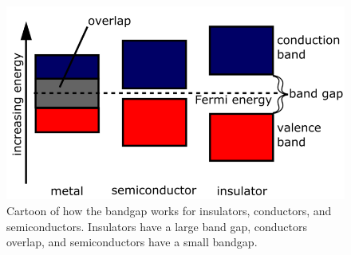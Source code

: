 \begin{figure}
    \centering
    \includegraphics[scale=0.5]{Setup_Figs/semiconductor.png}
    \caption{Cartoon of how the bandgap works for insulators, conductors, and semiconductors. Insulators have a large band gap, conductors overlap, and semiconductors have a small bandgap.}
    \label{fig:bandgap}
\end{figure}